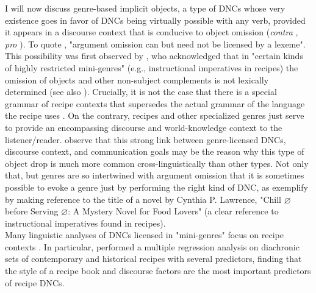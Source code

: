 I will now discuss genre-based implicit objects, a type of DNCs whose very existence goes in favor of DNCs being virtually possible with any verb, provided it appears in a discourse context that is conducive to object omission (\textit{contra} \textcite[55]{TonelliDelmonte2011}, \textit{pro} \textcite{Goldberg2001}). To quote \textcite[175]{RuppenhoferMichaelis2010}, "argument omission can but need not be licensed by a lexeme". This possibility was first observed by \textcite[95]{Fillmore1986}, who acknowledged that in "certain kinds of highly restricted mini-genres" (e.g., instructional imperatives in recipes) the omission of objects and other non-subject complements is not lexically determined (see also \textcite[237]{Haegeman1987}). Crucially, it is not the case that there is a special grammar of recipe contexts that supersedes the actual grammar of the language the recipe uses \parencite{Culy1996, Cote1996}. On the contrary, recipes and other specialized genres just serve to provide an encompassing discourse and world-knowledge context to the listener/reader. \textcite[30-31]{SigurdssonMaling2014} observe that this strong link between genre-licensed DNCs, discourse context, and communication goals may be the reason why this type of object drop is much more common cross-linguistically than other types. Not only that, but genres are so intertwined with argument omission that it is sometimes possible to evoke a genre just by performing the right kind of DNC, as \textcite[159]{RuppenhoferMichaelis2010} exemplify by making reference to the title of a novel by Cynthia P. Lawrence, "Chill $\varnothing$ before Serving $\varnothing$: A Mystery Novel for Food Lovers" (a clear reference to instructional imperatives found in recipes).\\
Many linguistic analyses of DNCs licensed in "mini-genres" focus on recipe contexts \parencite{Ahringberg2015, Garcia-VelascoMunoz2002, Megitt2019, Ruda2014, MassamRoberge1989, Bender, Culy1996, Massam1992,  PaulMassam2021recipes}. In particular, \textcite{Culy1996} performed a multiple regression analysis on diachronic sets of contemporary and historical recipes with several predictors, finding that the style of a recipe book and discourse factors are the most important predictors of recipe DNCs.\\
